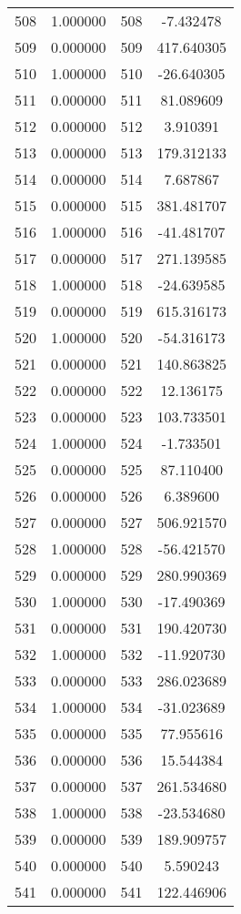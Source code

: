 \documentclass[12pt]{article}
\begin{document}
\begin{longtable}{@{}cccc@{}}
508 & 1.000000 & 508 & -7.432478 \\
509 & 0.000000 & 509 & 417.640305 \\
510 & 1.000000 & 510 & -26.640305 \\
511 & 0.000000 & 511 & 81.089609 \\
512 & 0.000000 & 512 & 3.910391 \\
513 & 0.000000 & 513 & 179.312133 \\
514 & 0.000000 & 514 & 7.687867 \\
515 & 0.000000 & 515 & 381.481707 \\
516 & 1.000000 & 516 & -41.481707 \\
517 & 0.000000 & 517 & 271.139585 \\
518 & 1.000000 & 518 & -24.639585 \\
519 & 0.000000 & 519 & 615.316173 \\
520 & 1.000000 & 520 & -54.316173 \\
521 & 0.000000 & 521 & 140.863825 \\
522 & 0.000000 & 522 & 12.136175 \\
523 & 0.000000 & 523 & 103.733501 \\
524 & 1.000000 & 524 & -1.733501 \\
525 & 0.000000 & 525 & 87.110400 \\
526 & 0.000000 & 526 & 6.389600 \\
527 & 0.000000 & 527 & 506.921570 \\
528 & 1.000000 & 528 & -56.421570 \\
529 & 0.000000 & 529 & 280.990369 \\
530 & 1.000000 & 530 & -17.490369 \\
531 & 0.000000 & 531 & 190.420730 \\
532 & 1.000000 & 532 & -11.920730 \\
533 & 0.000000 & 533 & 286.023689 \\
534 & 1.000000 & 534 & -31.023689 \\
535 & 0.000000 & 535 & 77.955616 \\
536 & 0.000000 & 536 & 15.544384 \\
537 & 0.000000 & 537 & 261.534680 \\
538 & 1.000000 & 538 & -23.534680 \\
539 & 0.000000 & 539 & 189.909757 \\
540 & 0.000000 & 540 & 5.590243 \\
541 & 0.000000 & 541 & 122.446906 \\

\end{longtable}
\end{document}

